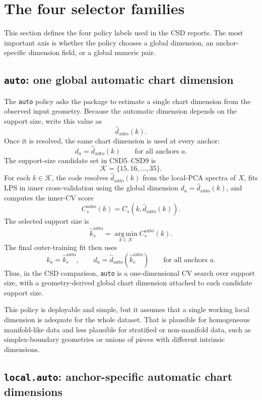 \documentclass[11pt]{article}
\newcommand{\argmin}{\operatorname*{arg\,min}}
\newcommand{\code}[1]{\texttt{#1}}
\begin{document}
\section{The four selector families}

This section defines the four policy labels used in the CSD reports.  The most
important axis is whether the policy chooses a global dimension, an
anchor-specific dimension field, or a global numeric pair.

\subsection{\code{auto}: one global automatic chart dimension}

The \code{auto} policy asks the package to estimate a single chart dimension from
the observed input geometry.  Because the automatic dimension depends on the
support size, write this value as
\[
  \widehat d_{\mathrm{auto}}(k).
\]
Once it is resolved, the same chart dimension is used at every anchor:
\[
  d_a=\widehat d_{\mathrm{auto}}(k)\qquad\text{for all anchors }a.
\]
The support-size candidate set in CSD5--CSD9 is
\[
  \mathcal K=\{15,16,\ldots,35\}.
\]
For each $k\in\mathcal K$, the code resolves
$\widehat d_{\mathrm{auto}}(k)$ from the local-PCA spectra of $X$, fits LPS in
inner cross-validation using the global dimension
$d_a=\widehat d_{\mathrm{auto}}(k)$, and computes the inner-CV score
\[
  C_s^{\mathrm{auto}}(k)
  =
  C_s\!\left(k,\widehat d_{\mathrm{auto}}(k)\right).
\]
The selected support size is
\[
  \widehat k_s^{\mathrm{auto}}
  =
  \argmin_{k\in\mathcal K} C_s^{\mathrm{auto}}(k).
\]
The final outer-training fit then uses
\[
  k_a=\widehat k_s^{\mathrm{auto}},
  \qquad
  d_a=\widehat d_{\mathrm{auto}}\!\left(\widehat k_s^{\mathrm{auto}}\right)
  \qquad\text{for all anchors }a.
\]
Thus, in the CSD comparison, \code{auto} is a one-dimensional CV search over
support size, with a geometry-derived global chart dimension attached to each
candidate support size.

This policy is deployable and simple, but it assumes that a single working local
dimension is adequate for the whole dataset.  That is plausible for homogeneous
manifold-like data and less plausible for stratified or non-manifold data, such
as simplex-boundary geometries or unions of pieces with different intrinsic
dimensions.

\subsection{\code{local.auto}: anchor-specific automatic chart dimensions}
\end{document}
